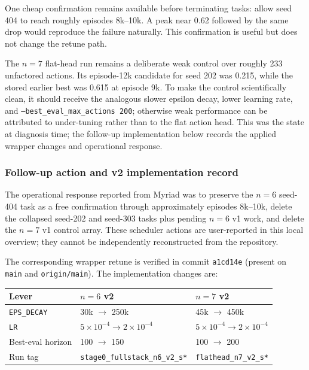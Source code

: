 \documentclass[11pt]{article}
\newcommand{\code}[1]{\texttt{#1}}
\begin{document}
One cheap confirmation remains available before terminating tasks: allow seed
404 to reach roughly episodes 8k--10k. A peak near 0.62 followed by the same drop
would reproduce the failure naturally. This confirmation is useful but does not
change the retune path.

The $n=7$ flat-head run remains a deliberate weak control over roughly 233
unfactored actions. Its episode-12k candidate for seed 202 was 0.215, while the
stored earlier best was 0.615 at episode 9k. To make the control scientifically
clean, it should receive the analogous slower epsilon decay, lower learning
rate, and \code{--best\_eval\_max\_actions 200}; otherwise weak performance can
be attributed to under-tuning rather than to the flat action head. This was the
state at diagnosis time; the follow-up implementation below records the applied
wrapper changes and operational response.

\subsubsection*{Follow-up action and v2 implementation record}

The operational response reported from Myriad was to preserve the $n=6$ seed-404
task as a free confirmation through approximately episodes 8k--10k, delete the
collapsed seed-202 and seed-303 tasks plus pending $n=6$ v1 work, and delete the
$n=7$ v1 control array. These scheduler actions are user-reported in this local
overview; they cannot be independently reconstructed from the repository.

The corresponding wrapper retune is verified in commit
\code{a1cd14e} (present on \code{main} and \code{origin/main}). The implementation
changes are:

\begin{center}
\small
\begin{tabular}{p{}p{}p{}}
\toprule
Lever & $n=6$ v2 & $n=7$ v2 \\
\midrule
\code{EPS\_DECAY} & 30k $\rightarrow$ 250k & 45k $\rightarrow$ 450k \\
\code{LR} & $5\times10^{-4} \rightarrow 2\times10^{-4}$
          & $5\times10^{-4} \rightarrow 2\times10^{-4}$ \\
Best-eval horizon & 100 $\rightarrow$ 150 & 100 $\rightarrow$ 200 \\
Run tag & \code{stage0\_fullstack\_n6\_v2\_s*}
        & \code{flathead\_n7\_v2\_s*} \\
\bottomrule
\end{tabular}
\end{center}
\end{document}
